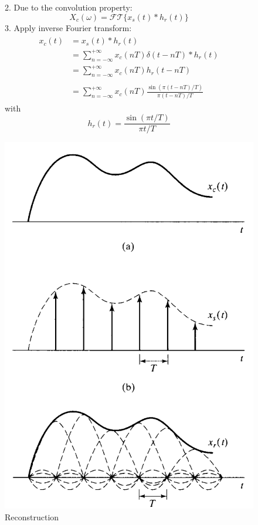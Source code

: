 \begin{figure}[H]
\begin{minipage}{0.65\textwidth}
2. Due to the convolution property:
\[ X_{c}(\omega) = \mathcal{FT} \{  x_{s}(t) * h_{r}(t) \} \]
3. Apply inverse Fourier transform:
\begin{align*} \begin{split}
 x_{c}(t)&= x_{s}(t) * h_{r}(t) \\
 &=\sum_{n=-\infty}^{+\infty} x_{c}(nT) \delta(t-nT) * h_{r}(t)\\
 &=\boxed{\sum_{n=-\infty}^{+\infty} x_{c}(nT) h_{r}(t-nT)}\\\\
 &=\sum_{n=-\infty}^{+\infty} x_{c}(nT) \frac{\sin(\pi(t-nT) / T)}{\pi(t-nT) / T}
\end{split}\end{align*}
with \[ h_{r}(t)=\frac{\sin(\pi t/T)}{\pi t/T} \]
\end{minipage} \hfill
\begin{minipage}{0.35\textwidth}
\includegraphics[width = \textwidth]{images/reconstruction2}
\caption{Reconstruction}
\end{minipage}
\end{figure}

